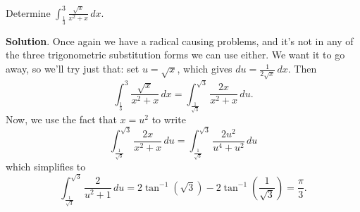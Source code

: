 \documentclass[10pt,]{book}
\theoremstyle{ptxplainnotitle}
\theoremstyle{ptxplaintitle}
\theoremstyle{ptxplainnotitle}
\theoremstyle{ptxplaintitle}
\theoremstyle{ptxplainnotitle}
\theoremstyle{ptxplaintitle}
\theoremstyle{ptxdefinitionnotitle}
\theoremstyle{ptxdefinitiontitle}
\theoremstyle{ptxdefinitionnotitle}
\theoremstyle{ptxdefinitiontitle}
\theoremstyle{ptxdefinitionnotitle}
\theoremstyle{ptxdefinitiontitle}
\theoremstyle{ptxdefinitionnotitle}
\theoremstyle{ptxdefinitiontitle}
\theoremstyle{ptxdefinitionnotitle}
\theoremstyle{ptxdefinitiontitle}
\numberwithin{equation}{section}
\begin{document}
\begin{example}\label{example-twisty-substitution}
\hypertarget{p-572}{}%
Determine \(\int_{\frac{1}{3}}^{3}\frac{\sqrt{x}}{x^{2} + x}\,dx.\)%
\par\smallskip%
\noindent\textbf{Solution}.\hypertarget{solution-125}{}\quad%
\hypertarget{p-573}{}%
Once again we have a radical causing problems, and it's not in any of the three trigonometric substitution forms we can use either. We want it to go away, so we'll try just that: set \(u = \sqrt{x}\), which gives \(du = \frac{1}{2\sqrt{x}}\,dx\). Then%
\begin{equation*}
\int_{\frac{1}{3}}^{3}\frac{\sqrt{x}}{x^{2} + x}\,dx = \int_{\frac{1}{\sqrt{3}}}^{\sqrt{3}}\frac{2x}{x^{2} + x}\,du.
\end{equation*}
Now, we use the fact that \(x = u^{2}\) to write%
\begin{equation*}
\int_{\frac{1}{\sqrt{3}}}^{\sqrt{3}}\frac{2x}{x^{2} + x}\,du = \int_{\frac{1}{\sqrt{3}}}^{\sqrt{3}}\frac{2u^{2}}{u^{4} + u^{2}}\,du
\end{equation*}
which simplifies to%
\begin{equation*}
\int_{\frac{1}{\sqrt{3}}}^{\sqrt{3}}\frac{2}{u^{2} + 1}\,du = 2\tan^{-1}(\sqrt{3}) - 2\tan^{-1}\left(\frac{1}{\sqrt{3}}\right) = \frac{\pi}{3}.
\end{equation*}
%
\end{example}
\typeout{************************************************}
\typeout{************************************************}
\end{document}
